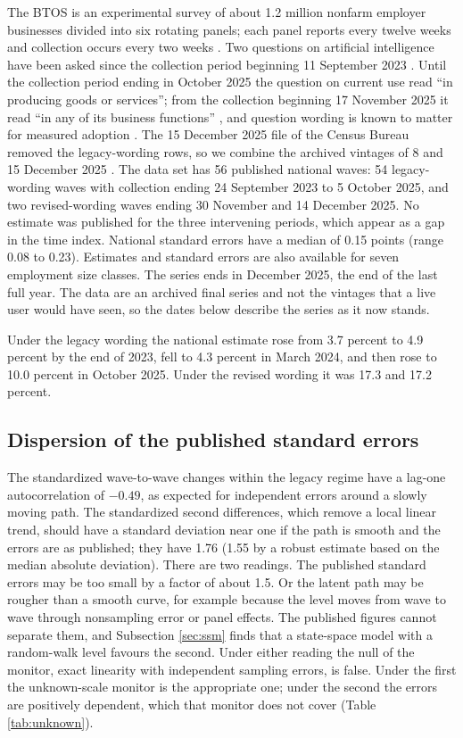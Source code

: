 \documentclass[Afour,sageh,times]{sagej}
\theoremstyle{definition}
\begin{document}
The BTOS is an experimental survey of about 1.2 million nonfarm employer businesses divided into six rotating panels; each panel reports every twelve weeks and collection occurs every two weeks \citep{censusmethod2025}. Two questions on artificial intelligence have been asked since the collection period beginning 11 September 2023 \citep{bonney2024}. Until the collection period ending in October 2025 the question on current use read ``in producing goods or services''; from the collection beginning 17 November 2025 it read ``in any of its business functions'' \citep{census2026pr}, and question wording is known to matter for measured adoption \citep{bick2026}. The 15 December 2025 file of the Census Bureau removed the legacy-wording rows, so we combine the archived vintages of 8 and 15 December 2025 \citep{goldschlag2025}. The data set has 56 published national waves: 54 legacy-wording waves with collection ending 24 September 2023 to 5 October 2025, and two revised-wording waves ending 30 November and 14 December 2025. No estimate was published for the three intervening periods, which appear as a gap in the time index. National standard errors have a median of 0.15 points (range 0.08 to 0.23). Estimates and standard errors are also available for seven employment size classes. The series ends in December 2025, the end of the last full year. The data are an archived final series and not the vintages that a live user would have seen, so the dates below describe the series as it now stands.

Under the legacy wording the national estimate rose from 3.7 percent to 4.9 percent by the end of 2023, fell to 4.3 percent in March 2024, and then rose to 10.0 percent in October 2025. Under the revised wording it was 17.3 and 17.2 percent.

\subsection{Dispersion of the published standard errors}
\label{sec:dispersion}

The standardized wave-to-wave changes within the legacy regime have a lag-one autocorrelation of $-0.49$, as expected for independent errors around a slowly moving path. The standardized second differences, which remove a local linear trend, should have a standard deviation near one if the path is smooth and the errors are as published; they have 1.76 (1.55 by a robust estimate based on the median absolute deviation). There are two readings. The published standard errors may be too small by a factor of about 1.5. Or the latent path may be rougher than a smooth curve, for example because the level moves from wave to wave through nonsampling error or panel effects. The published figures cannot separate them, and Subsection \ref{sec:ssm} finds that a state-space model with a random-walk level favours the second. Under either reading the null of the monitor, exact linearity with independent sampling errors, is false. Under the first the unknown-scale monitor is the appropriate one; under the second the errors are positively dependent, which that monitor does not cover (Table \ref{tab:unknown}).
\end{document}
